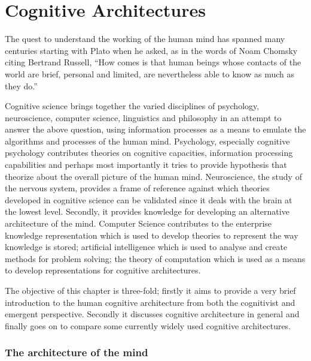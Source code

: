 \chapter{Cognitive Architectures}
\label{chap-two}
The quest to understand the working of the human mind has spanned
many centuries starting with Plato when he asked, as in the words of
Noam Chomsky citing Bertrand Russell, ``How comes is that human beings
whose contacts of the world are brief, personal and limited, are
nevertheless able to know as much as they do.'' \cite{Bogdan:1993aa}

Cognitive science brings together the varied disciplines of
psychology, neuroscience, computer science, linguistics and philosophy in an
attempt to answer the above question, using information processes as a
means to emulate the algorithms and processes of the human
mind. Psychology, especially cognitive psychology contributes theories
on cognitive capacities, information processing capabilities and
perhaps most importantly it tries to provide hypothesis that theorize
about the overall picture of the human mind. Neuroscience, the study
of the nervous system,  provides a frame of reference against which
theories developed in cognitive science can be validated since it
deals with the brain at the lowest level. Secondly, it provides  knowledge
for developing an alternative architecture of the mind. Computer
Science contributes to the enterprise knowledge representation which is
used to develop theories to represent the way knowledge is stored;
artificial intelligence which is used to analyse and create methods
for problem solving; the theory of computation which is used as a
means to develop representations for cognitive
architectures.

The objective of this chapter is three-fold; firstly it aims
to provide a very brief introduction to the human cognitive
architecture from both the cognitivist and
emergent\cite{DBLP:journals/tec/VernonMS07} perspective. Secondly
it discusses cognitive architecture in general and finally goes on
to compare some currently widely used cognitive architectures.

\subsection{The architecture of the mind}
\label{mindArch}



